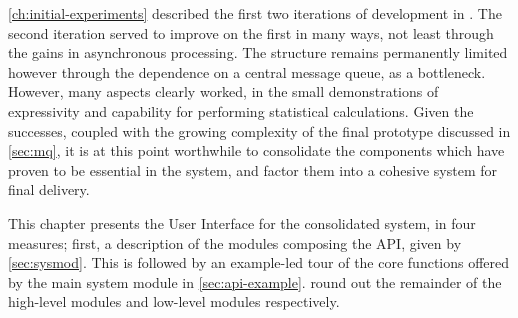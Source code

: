 \cref{ch:initial-experiments} described the first two iterations of development in \lsr{}.
The second iteration served to improve on the first in many ways, not least through the gains in asynchronous processing.
The structure remains permanently limited however through the dependence on a central message queue, as a bottleneck.
However, many aspects clearly worked, in the small demonstrations of expressivity and capability for performing statistical calculations.
Given the successes, coupled with the growing complexity of the final prototype discussed in \cref{sec:mq}, it is at this point worthwhile to consolidate the components which have proven to be essential in the system, and factor them into a cohesive system for final delivery.

This chapter presents the User Interface for the consolidated system, in four measures; first, a description of the modules composing the API, given by \cref{sec:sysmod}.
This is followed by an example-led tour of the core functions offered by the main system module in \cref{sec:api-example}.
 round out the remainder of the high-level modules and low-level modules respectively.
